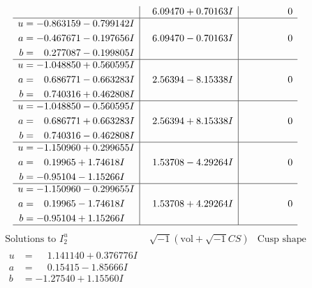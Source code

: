 \documentclass[1p]{elsarticle_modified}
\theoremstyle{definition}
\newcommand{\I}{\sqrt{-1}}
\begin{document}
$$\begin{array}{c|c|c}
 & \phantom{-}6.09470 + 0.70163 I & \phantom{-0.000000 } 0 \\ \hline\begin{aligned}
u &= -0.863159 - 0.799142 I \\
a &= -0.467671 - 0.197656 I \\
b &= \phantom{-}0.277087 - 0.199805 I\end{aligned}
 & \phantom{-}6.09470 - 0.70163 I & \phantom{-0.000000 } 0 \\ \hline\begin{aligned}
u &= -1.048850 + 0.560595 I \\
a &= \phantom{-}0.686771 - 0.663283 I \\
b &= \phantom{-}0.740316 + 0.462808 I\end{aligned}
 & \phantom{-}2.56394 - 8.15338 I & \phantom{-0.000000 } 0 \\ \hline\begin{aligned}
u &= -1.048850 - 0.560595 I \\
a &= \phantom{-}0.686771 + 0.663283 I \\
b &= \phantom{-}0.740316 - 0.462808 I\end{aligned}
 & \phantom{-}2.56394 + 8.15338 I & \phantom{-0.000000 } 0 \\ \hline\begin{aligned}
u &= -1.150960 + 0.299655 I \\
a &= \phantom{-}0.19965 + 1.74618 I \\
b &= -0.95104 - 1.15266 I\end{aligned}
 & \phantom{-}1.53708 - 4.29264 I & \phantom{-0.000000 } 0 \\ \hline\begin{aligned}
u &= -1.150960 - 0.299655 I \\
a &= \phantom{-}0.19965 - 1.74618 I \\
b &= -0.95104 + 1.15266 I\end{aligned}
 & \phantom{-}1.53708 + 4.29264 I & \phantom{-0.000000 } 0\\
 \hline 
 \end{array}$$\newpage$$\begin{array}{c|c|c}  
\text{Solutions to }I^u_{2}& \I (\text{vol} + \sqrt{-1}CS) & \text{Cusp shape}\\
 \hline 
\begin{aligned}
u &= \phantom{-}1.141140 + 0.376776 I \\
a &= \phantom{-}0.15415 - 1.85666 I \\
b &= -1.27540 + 1.15560 I\end{aligned}

\end{array}$$
\end{document}
